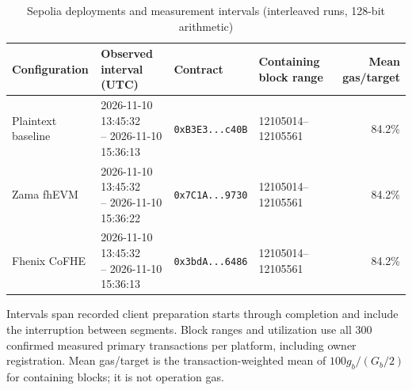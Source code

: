 \begin{table}[!t]
\caption{Sepolia deployments and measurement intervals (interleaved runs, 128-bit arithmetic)}
\label{tab:sepolia-experiment-deployments-128}
\centering
\footnotesize
\setlength{\tabcolsep}{4pt}
\begin{tabular}{|l|l|l|l|r|}
\hline
\textbf{Configuration} &
\textbf{Observed interval (UTC)} &
\textbf{Contract} &
\textbf{Containing block range} &
\textbf{Mean gas/target} \\
\hline
Plaintext baseline &
\shortstack[l]{2026-11-10 13:45:32 \\ -- 2026-11-10 15:36:13} &
\texttt{0xB3E3...c40B} &
12105014--12105561 &
84.2\% \\
\hline
Zama fhEVM &
\shortstack[l]{2026-11-10 13:45:32 \\ -- 2026-11-10 15:36:22} &
\texttt{0x7C1A...9730} &
12105014--12105561 &
84.2\% \\
\hline
Fhenix CoFHE &
\shortstack[l]{2026-11-10 13:45:32 \\ -- 2026-11-10 15:36:13} &
\texttt{0x3bdA...6486} &
12105014--12105561 &
84.2\% \\
\hline
\end{tabular}
\vspace{2pt}
\parbox{\textwidth}{\scriptsize Intervals span recorded client preparation starts through completion and include the interruption between segments. Block ranges and utilization use all 300 confirmed measured primary transactions per platform, including owner registration. Mean gas/target is the transaction-weighted mean of $100g_b/(G_b/2)$ for containing blocks; it is not operation gas.}
\end{table}
